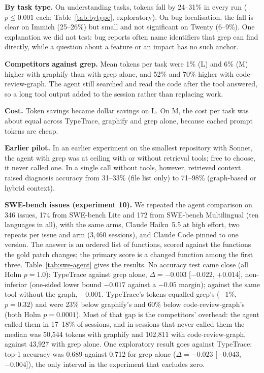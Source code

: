 \documentclass[sigconf,nonacm]{acmart}
\newcommand{\tool}{TypeTrace\xspace}
\newcommand{\gfy}{graphify\xspace}
\newcommand{\crg}{code-review-graph\xspace}
\begin{document}
\textbf{By task type.} On understanding tasks, tokens fall by 24--31\% in every run ($p \le 0.001$ each; Table~\ref{tab:bytype}, exploratory). On bug localisation, the fall is clear on Immich (25--26\%) but small and not significant on Twenty (6--9\%). One explanation we did not test: bug reports often name identifiers that grep can find directly, while a question about a feature or an impact has no such anchor.

\textbf{Competitors against grep.} Mean tokens per task were 1\% (L) and 6\% (M) higher with \gfy than with grep alone, and 52\% and 70\% higher with \crg. The agent still searched and read the code after the tool answered, so a long tool output added to the session rather than replacing work.

\textbf{Cost.} Token savings became dollar savings on L. On M, the cost per task was about equal across \tool, \gfy and grep alone, because cached prompt tokens are cheap.

\textbf{Earlier pilot.} In an earlier experiment on the smallest repository with Sonnet, the agent with grep was at ceiling with or without retrieval tools; free to choose, it never called one. In a single call without tools, however, retrieved context raised diagnosis accuracy from 31--33\% (file list only) to 71--98\% (graph-based or hybrid context).

\textbf{SWE-bench issues (experiment 10).} We repeated the agent comparison on 346 issues, 174 from SWE-bench Lite and 172 from SWE-bench Multilingual (ten languages in all), with the same arms, Claude Haiku~5.5 at high effort, two repeats per issue and arm (3,460 sessions), and Claude Code pinned to one version. The answer is an ordered list of functions, scored against the functions the gold patch changes; the primary score is a changed function among the first three. Table~\ref{tab:swe-agent} gives the results. No accuracy test came close (all Holm $p = 1.0$): \tool against grep alone, $\Delta = -0.003$ [$-0.022$, $+0.014$], non-inferior (one-sided lower bound $-0.017$ against a $-0.05$ margin); against the same tool without the graph, $-0.001$. \tool's tokens equalled grep's ($-1\%$, $p = 0.32$) and were 23\% below \gfy's and 60\% below \crg's (both Holm $p = 0.0001$). Most of that gap is the competitors' overhead: the agent called them in 17--18\% of sessions, and in sessions that never called them the median was 50{,}544 tokens with \gfy and 102{,}811 with \crg, against 43{,}927 with grep alone. One exploratory result goes against \tool: top-1 accuracy was 0.689 against 0.712 for grep alone ($\Delta = -0.023$ [$-0.043$, $-0.004$]), the only interval in the experiment that excludes zero.
\end{document}
